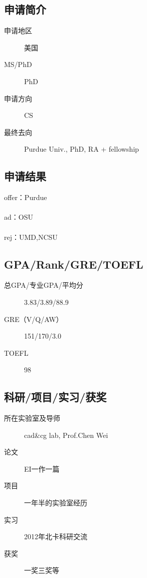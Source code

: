 \documentclass[11pt,fleqn,openany]{book} %
\begin{document}
\noindent\begin{minipage}[t]{0.45\textwidth}
\subsection*{申请简介}
\begin{description}
\item[申请地区] 美国
\item[MS/PhD] PhD
\item[申请方向] CS
\item[最终去向] Purdue Univ., PhD, RA + fellowship
\end{description}
\end{minipage}
\hfill
\begin{minipage}[t]{0.45\textwidth}
\subsection*{申请结果}
\noindent offer：Purdue\\
\\
ad：OSU\\
\\
rej：UMD,NCSU
\end{minipage}
\subsection*{GPA/Rank/GRE/TOEFL}
\begin{description}
\item[总GPA/专业GPA/平均分] 3.83/3.89/88.9
\item[GRE（V/Q/AW）] 151/170/3.0
\item[TOEFL] 98
\end{description}

\subsection*{科研/项目/实习/获奖}
\begin{description}
\item[所在实验室及导师] cad\&cg lab, Prof.Chen Wei
\item[论文] EI一作一篇
\item[项目] 一年半的实验室经历
\item[实习] 2012年北卡科研交流
\item[获奖] 一奖三奖等
\end{description}
\end{document}
